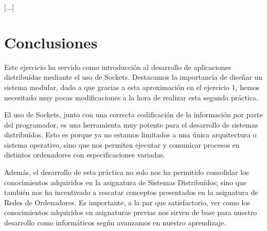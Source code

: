\documentclass[]{article}
\begin{document}
[...]

\section{Conclusiones}
\label{sec:conclusiones}
Este ejercicio ha servido como introducción al desarrollo de aplicaciones distribuídas mediante el uso de Sockets. Destacamos la importancia de diseñar un sistema modular, dado a que gracias a esta aproximación en el ejercicio 1, hemos necesitado muy pocas modificaciones a la hora de realizar esta segunda práctica. 

El uso de Sockets, junto con una correcta codificación de la información por parte del programador, es una herramienta muy potente para el desarrollo de sistemas distribuídos. Esto es porque ya no estamos limitados a una única arquitectura o sistema operativo, sino que nos permiten ejecutar y comunicar procesos en distintos ordenadores con especificaciones variadas. 

Además, el desarrollo de esta práctica no solo nos ha permitido consolidar los conocimientos adquiridos en la asignatura de Sistemas Distribuídos; sino que también nos ha incentivado a rescatar conceptos presentados en la asignatura de Redes de Ordenadores. Es importante, a la par que satisfactorio, ver como los conocimientos adquiridos en asignaturas previas nos sirven de base para nuestro desarrollo como informáticos según avanzamos en nuestro aprendizaje. 
\end{document}
